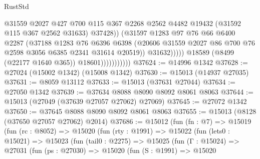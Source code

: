 \begin{lexlean}{RustStd}
\begin{coremodule}
                                      @31559
                                      @2027
                                      @427
                                      @700
                                      @115
                                      @367
                                      @2268
                                      @2562
                                      @4482
                                      @19432
                                      (@31592 @115 @367 @2562 @31633)
                                      @37428))
                                  (@31597
                                    @1283
                                    @97
                                    @76
                                    @66
                                    @6400
                                    @2287
                                    (@37188
                                      @1283
                                      @76
                                      @6396
                                      @6398
                                      (@20606
                                        @31559
                                        @2027
                                        @86
                                        @700
                                        @76
                                        @2598
                                        @3056
                                        @6385
                                        @2341
                                        @31614
                                        @20519))
                                    @31632)))))
                          @18589
                          (@8499 (@22177 @1640 @365))
                          @18601)))))))))))
@37624 := @14996 @1342
@37628 := @27024 (@15002 @1342) (@15008 @1342)
@37630 := @15013 (@14937 @27035)
@37631 := @8059 @13112
@37633 := @15013 (@37631 @27044)
@37634 := @27050 @1342
@37639 := @37634 @8088 @8090 @8092 @8061 @8063
@37644 := @15013 (@27049 (@37639 @27057 @27062) @27069)
@37645 := @27072 @1342
@37650 := @37645 @8088 @8090 @8092 @8061 @8063
@37655 := @15013 (@8128 (@37650 @27057 @27062) @2014)
@37686 := @15012
    (fun (fn : @7) =>
    @15019
      (fun (rc : @8052) =>
      @15020
        (fun (rty : @1991) =>
        @15022
          (fun (lets0 : @15021) =>
          @15023
            (fun (tail0 : @2275) =>
            @15025
              (fun (Γ : @15024) =>
              @27031
                (fun (ps : @27030) =>
                @15020
                  (fun (S : @1991) =>
                  @15020

\end{coremodule}
\end{lexlean}
